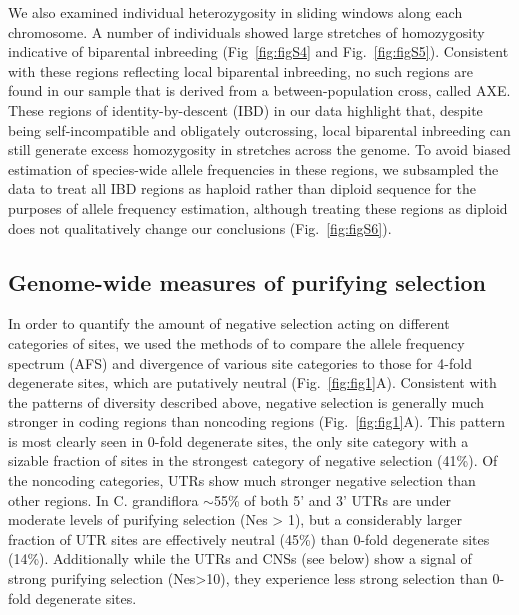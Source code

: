 We also examined individual heterozygosity in sliding windows along each chromosome. A number of individuals showed large stretches of homozygosity indicative of biparental inbreeding (Fig~\ref{fig:figS4} and Fig.~\ref{fig:figS5}). Consistent with these regions reflecting local biparental inbreeding, no such regions are found in our sample that is derived from a between-population cross, called AXE. These regions of identity-by-descent (IBD) in our data highlight that, despite being self-incompatible and obligately outcrossing, local biparental inbreeding can still generate excess homozygosity in stretches across the genome. To avoid biased estimation of species-wide allele frequencies in these regions, we subsampled the data to treat all IBD regions as haploid rather than diploid sequence for the purposes of allele frequency estimation, although treating these regions as diploid does not qualitatively change our conclusions (Fig.~\ref{fig:figS6}).

\subsection{Genome-wide measures of purifying selection}
In order to quantify the amount of negative selection acting on different categories of sites, we used the methods of \citet{keightley2010} to compare the allele frequency spectrum (AFS) and divergence of various site categories to those for 4-fold degenerate sites, which are putatively neutral (Fig.~\ref{fig:fig1}A). Consistent with the patterns of diversity described above, negative selection is generally much stronger in coding regions than noncoding regions (Fig.~\ref{fig:fig1}A). This pattern is most clearly seen in 0-fold degenerate sites, the only site category with a sizable fraction of sites in the strongest category of negative selection (41\%). Of the noncoding categories, UTRs show much stronger negative selection than other regions. In C. grandiflora $\sim$55\% of both 5' and 3' UTRs are under moderate levels of purifying selection (Nes > 1), but a considerably larger fraction of UTR sites are effectively neutral (45\%) than 0-fold degenerate sites (14\%). Additionally while the UTRs and CNSs (see below) show a signal of strong purifying selection (Nes>10), they experience less strong selection than 0-fold degenerate sites. 


